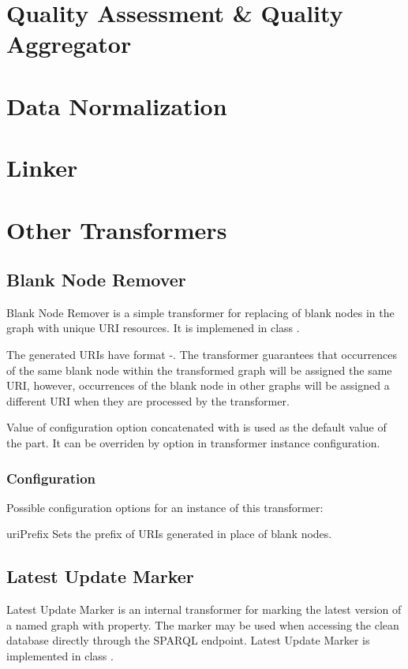\section{Quality Assessment \& Quality Aggregator}
\section{Data Normalization}
\section{Linker}
\section{Other Transformers}
\subsection{Blank Node Remover}
Blank Node Remover is a simple transformer for replacing of blank nodes in the  graph with unique URI resources. It is implemened in class .

The generated URIs have format {-}. The transformer guarantees that occurrences of the same blank node within the transformed graph
 will be assigned the same URI, however, occurrences of the blank node in other graphs will be assigned a different URI when they are processed by the transformer.

Value of  configuration option concatenated with  is used as the default value of the  part. It can be overriden by  option in transformer instance configuration.

\subsubsection{Configuration}
Possible configuration options for an instance of this transformer:
\begin{configlist}
	\item[uriPrefix] Sets the prefix of URIs generated in place of blank nodes.
\end{configlist}

\subsection{Latest Update Marker}
\label{sec:latestUpdateMarker}
Latest Update Marker is an internal transformer for marking the latest version of a named graph with  property. The marker may be used when accessing the clean database directly through the SPARQL endpoint. Latest Update Marker is implemented in class .

